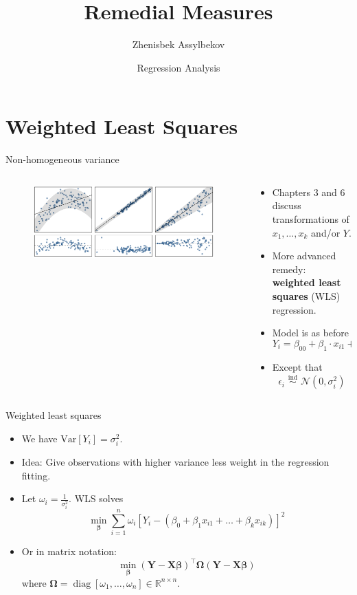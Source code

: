 \documentclass{beamer}
\title{Remedial Measures}
\author{Zhenisbek Assylbekov}
\institute{Department of Mathematics}
\date{Regression Analysis}
\newcommand{\Var}{\mathrm{Var}}
\DeclareMathOperator{\diag}{diag}
\begin{document}
\begin{frame}
  \titlepage
\end{frame}

\section{Weighted Least Squares}
\begin{frame}{Non-homogeneous variance}
\begin{columns}
\begin{column}{.4\textwidth}
\begin{figure}
    \centering
    \includegraphics[width=.9\textwidth]{plots/heteroscedastic.pdf}
\end{figure}
\end{column}
\begin{column}{.6\textwidth}
\begin{itemize}
    \item Chapters 3 and 6 discuss transformations of $x_1, \ldots, x_k$ and/or $Y$.
    \item<2-> More advanced remedy: \textbf{weighted least squares} (WLS) regression.
    \item<3-> Model is as before
    $$
    Y_i = \beta_00 + \beta_1\cdot x_{i1} + \ldots + \beta_k\cdot x_{ik} + \epsilon_i,
    $$
    \item<4-> Except that
    $$
    \epsilon_i\,\,{\stackrel{\text{ind}}{\sim}}\,\,\mathcal{N}(0,\sigma^2_i)    
    $$
\end{itemize}
\end{column}
\end{columns}
\end{frame}

\begin{frame}{Weighted least squares}
\begin{itemize}
\item We have $\Var[Y_i] = \sigma_i^2$. 
\item<2-> Idea: Give observations with higher variance less
weight in the regression fitting.
\item<3-> Let $\omega_i=\frac{1}{\sigma^2_i}$. WLS solves
$$
\min_{\boldsymbol\beta}\sum_{i=1}^n\omega_i[Y_i-(\beta_0+\beta_1 x_{i1}+\ldots+\beta_k x_{ik})]^2
$$
\item<4-> Or in matrix notation:
$$\min_{\boldsymbol\beta}(\mathbf{Y}-\mathbf{X}\boldsymbol\beta)^\top\mathbf{\Omega}(\mathbf{Y}-\mathbf{X}\boldsymbol\beta)$$
where $\mathbf{\Omega}=\diag[\omega_1,\ldots,\omega_n]\in\mathbb{R}^{n\times n}$.
\end{itemize}
\end{frame}
\end{document}
